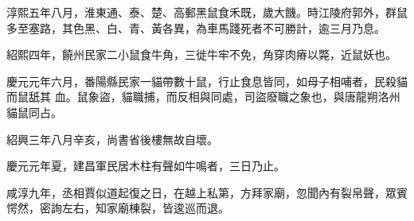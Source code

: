 \begin{pinyinscope}
 淳熙五年八月，淮東通、泰、楚、高郵黑鼠食禾既，歲大饑。時江陵府郭外，群鼠多至塞路，其色黑、白、青、黃各異，為車馬踐死者不可勝計，逾三月乃息。



 紹熙四年，饒州民家二小鼠食牛角，三徙牛牢不免，角穿肉瘠以斃，近鼠妖也。



 慶元元年六月，番陽縣民家一貓帶數十鼠，行止食息皆同，如母子相哺者，民殺貓而鼠舐其
 血。鼠象盜，貓職捕，而反相與同處，司盜廢職之象也，與唐龍朔洛州貓鼠同占。



 紹興三年八月辛亥，尚書省後樓無故自壞。



 慶元元年夏，建昌軍民居木柱有聲如牛鳴者，三日乃止。



 咸淳九年，丞相賈似道起復之日，在越上私第，方拜家廟，忽聞內有裂帛聲，眾賓愕然，密詢左右，知家廟棟裂，皆逡巡而退。



\end{pinyinscope}